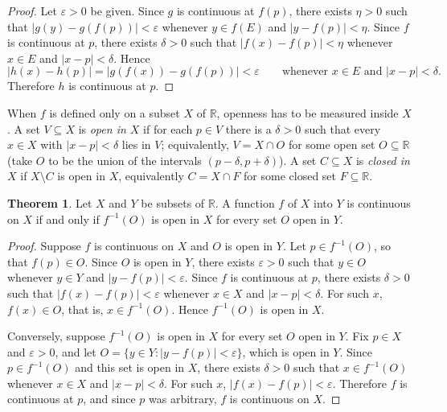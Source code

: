 \documentclass[11pt,a4paper]{article}
\numberwithin{equation}{section}
\theoremstyle{definition}
\newtheorem{thm}{Theorem}[subsection]
\begin{document}
\begin{proof}
Let $\varepsilon > 0$ be given. Since $g$ is continuous at $f(p)$, there exists $\eta > 0$ such that $|g(y) - g(f(p))| < \varepsilon$ whenever $y \in f(E)$ and $|y - f(p)| < \eta$. Since $f$ is continuous at $p$, there exists $\delta > 0$ such that $|f(x) - f(p)|  < \eta$ whenever $x\in E$ and $|x - p| < \delta$. Hence
$$|h(x) - h(p)| = |g(f(x)) - g(f(p))| < \varepsilon \qquad\text{whenever } x\in E \text{ and } |x - p| < \delta .$$
Therefore $h$ is continuous at $p$.
\end{proof}

When $f$ is defined only on a subset $X$ of $\mathbb{R}$, openness has to be measured inside $X$. A set $V\subseteq X$ is \emph{open in $X$} if for each $p\in V$ there is a $\delta>0$ such that every $x\in X$ with $|x-p|<\delta$ lies in $V$; equivalently, $V = X\cap O$ for some open set $O\subseteq\mathbb{R}$ (take $O$ to be the union of the intervals $(p-\delta,p+\delta)$). A set $C\subseteq X$ is \emph{closed in $X$} if $X\setminus C$ is open in $X$, equivalently $C = X\cap F$ for some closed set $F\subseteq\mathbb{R}$.


\begin{thm}
Let $X$ and $Y$ be subsets of $\mathbb{R}$. A function $f$ of $X$ into $Y$ is continuous on $X$ if and only if $f^{-1}(O)$ is open in $X$ for every set $O$ open in $Y$.
\end{thm}

\begin{proof}
Suppose $f$ is continuous on $X$ and $O$ is open in $Y$. Let $p\in f^{-1}(O)$, so that $f(p)\in O$. Since $O$ is open in $Y$, there exists $\varepsilon > 0$ such that $y \in O$ whenever $y\in Y$ and $|y - f(p)| < \varepsilon$. Since $f$ is continuous at $p$, there exists $\delta > 0$ such that $|f(x) - f(p)| < \varepsilon$ whenever $x\in X$ and $|x - p| < \delta$. For such $x$, $f(x)\in O$, that is, $x \in f^{-1}(O)$. Hence $f^{-1}(O)$ is open in $X$.

Conversely, suppose $f^{-1}(O)$ is open in $X$ for every set $O$ open in $Y$. Fix $p\in X$ and $\varepsilon > 0$, and let $O = \{y\in Y : |y - f(p)| < \varepsilon\}$, which is open in $Y$. Since $p\in f^{-1}(O)$ and this set is open in $X$, there exists $\delta > 0$ such that $x\in f^{-1}(O)$ whenever $x\in X$ and $|x - p|< \delta$. For such $x$, $|f(x) - f(p)| < \varepsilon$. Therefore $f$ is continuous at $p$, and since $p$ was arbitrary, $f$ is continuous on $X$.
\end{proof}
\end{document}
